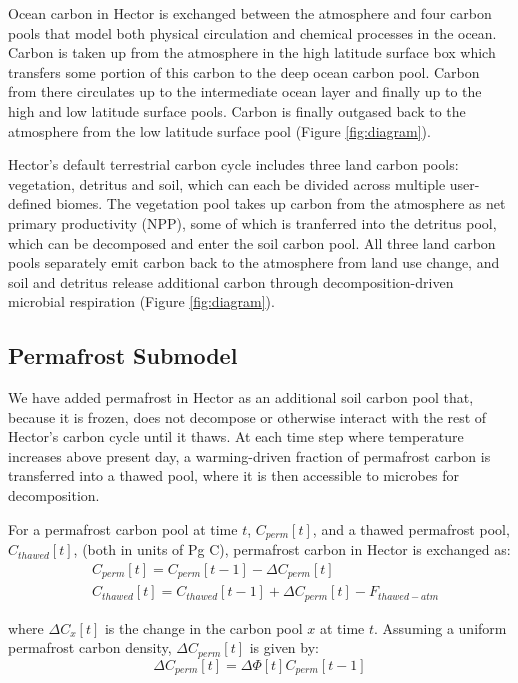 \documentclass[essd, manuscript]{copernicus}
\begin{document}
Ocean carbon in Hector is exchanged between the atmosphere and four carbon pools that model both physical circulation and chemical processes in the ocean. Carbon is taken up from the atmosphere in the high latitude surface box which transfers some portion of this carbon to the deep ocean carbon pool. Carbon from there circulates up to the intermediate ocean layer and finally up to the high and low latitude surface pools. Carbon is finally outgased back to the atmosphere from the low latitude surface pool (Figure \ref{fig:diagram}).

Hector's default terrestrial carbon cycle includes three land carbon pools: vegetation, detritus and soil, which can each be divided across multiple user-defined biomes. The vegetation pool takes up carbon from the atmosphere as net primary productivity (NPP), some of which is tranferred into the detritus pool, which can be decomposed and enter the soil carbon pool. All three land carbon pools separately emit carbon back to the atmosphere from land use change, and soil and detritus release additional carbon through decomposition-driven microbial respiration (Figure \ref{fig:diagram}).  

\subsection{Permafrost Submodel}
We have added permafrost in Hector as an additional soil carbon pool that, because it is frozen, does not decompose or otherwise interact with the rest of Hector's carbon cycle until it thaws. At each time step where temperature increases above present day, a warming-driven fraction of permafrost carbon is transferred into a thawed pool, where it is then accessible to microbes for decomposition. 

For a permafrost carbon pool at time $t$, $C_{perm}[t]$, and a thawed permafrost pool, $C_{thawed}[t]$, (both in units of Pg C), permafrost carbon in Hector is exchanged as: 
\begin{align}
&C_{perm}[t] = C_{perm}[t-1] - \Delta C_{perm}[t]\\
&C_{thawed}[t] = C_{thawed}[t-1] + \Delta C_{perm}[t] - F_{thawed-atm}
\end{align}

where $\Delta C_x[t]$ is the change in the carbon pool $x$ at time $t$. Assuming a uniform permafrost carbon density, $\Delta C_{perm}[t]$ is given by:
\begin{equation} 
\Delta C_{perm}[t] = \Delta \Phi[t] C_{perm}[t-1]
\end{equation}
\end{document}
